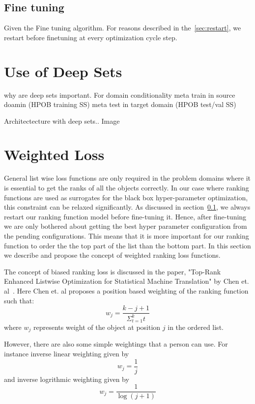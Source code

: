 \documentclass[11pt]{report}
\begin{document}
\subsection{Fine tuning}\label{sec:rlfinetune}
Given the Fine tuning algorithm.
For reasons described in the~\ref{sec:restart},  we restart before finetuning at every optimization cycle step.

\section{Use of Deep Sets}
why are deep sets important. 
For domain conditionality 
meta train in source doamin (HPOB training SS)
meta test in target domain (HPOB test/val SS)

Architectecture with deep sets.. Image


\section{Weighted Loss}
General list wise loss functions are only required in the problem domains where it is essential to get the ranks of all the objects correctly.
In our case where ranking functions are used as surrogates for the black box hyper-parameter optimization,
this constraint can be relaxed significantly.
As discussed in section~\ref{sec:rlfinetune},  we always restart our ranking function model before
fine-tuning it.
Hence,  after fine-tuning we are only bothered about getting the best hyper parameter configuration from the pending configurations.
This means that it is more important for our ranking function to order the the top part of the list than the bottom part.
In this section we describe and propose the concept of weighted ranking loss functions.

The concept of biased ranking loss is discussed in the paper, "Top-Rank Enhanced Listwise Optimization for Statistical Machine Translation" by  Chen et. al~\cite{TRLWO}.
Here Chen et. al proposes a position based weighting of the ranking function such that:
\begin{equation}
w_j = \frac{k - j + 1}{\Sigma_{t=1}^k t}
\end{equation}
where $w_j$ represents weight of the object at position $j$ in the ordered list.

However, there are also some simple weightings that a person can use.  For instance inverse linear weighting given by
\begin{equation}
w_j = \frac{1}{j}
\end{equation}
and inverse logrithmic weighting given by
\begin{equation}
w_j = \frac{1}{\log (j+1)}
\end{equation}
\end{document}
